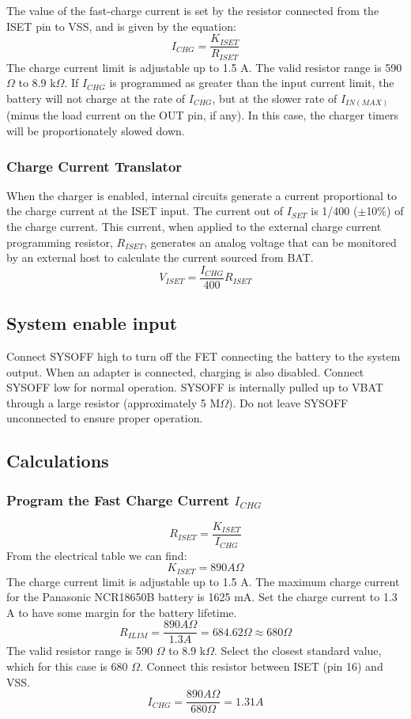 \documentclass[11pt,a4paper]{article}
\begin{document}
The value of the fast-charge current is set by the resistor connected from the ISET pin to VSS, and is given by the equation:
\[ I_{CHG} = \frac{K_{ISET}}{R_{ISET}} \]
The charge current limit is adjustable up to 1.5 A. The valid resistor range is 590 $\Omega$ to 8.9 k$\Omega$. If $I_{CHG}$ is programmed as greater than the input current limit, the battery will not charge at the rate of $I_{CHG}$, but at the slower rate of $I_{IN(MAX)}$ (minus the load current on the OUT pin, if any). In this case, the charger timers will be proportionately slowed down.

\subsubsection{Charge Current Translator}
When the charger is enabled, internal circuits generate a current proportional to the charge current at the ISET input. The current out of $I_{SET}$ is 1/400 ($\pm$10\%) of the charge current. This current, when applied to the external charge current programming resistor, $R_{ISET}$, generates an analog voltage that can be monitored by an external host to calculate the current sourced from BAT.
\[ V_{ISET} = \frac{I_{CHG}}{400} R_{ISET} \]

\subsection{System enable input}
Connect SYSOFF high to turn off the FET connecting the battery to the system output. When an adapter is connected, charging is also disabled. Connect SYSOFF low for normal operation. SYSOFF is internally pulled up to VBAT through a large resistor (approximately 5 M$\Omega$). Do not leave SYSOFF unconnected to ensure proper operation.

\subsection{Calculations}
\subsubsection{Program the Fast Charge Current $I_{CHG}$}
\[ R_{ISET} = \frac{K_{ISET}}{I_{CHG}} \]
From the electrical table we can find:
\[ K_{ISET} = 890 A\Omega \]
The charge current limit is adjustable up to 1.5 A. The maximum charge current for the Panasonic NCR18650B battery is 1625 mA. Set the charge current to 1.3 A to have some margin for the battery lifetime.
\[ R_{ILIM} = \frac{890 A\Omega}{1.3 A} = 684.62 \Omega \approx 680 \Omega \]
The valid resistor range is 590 $\Omega$ to 8.9 k$\Omega$. Select the closest standard value, which for this case is 680 $\Omega$. Connect this resistor between ISET (pin 16) and VSS.
\[ I_{CHG} = \frac{890 A\Omega}{680 \Omega} = 1.31 A \]
\end{document}
